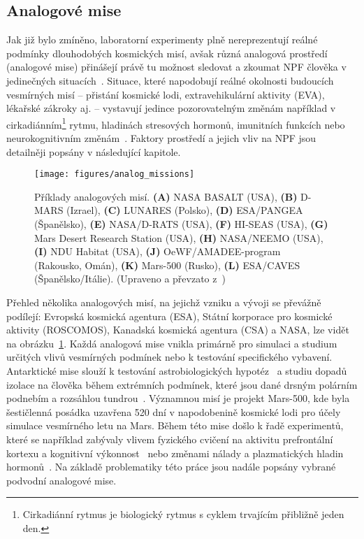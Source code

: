 \subsection{Analogové mise}
\label{subsection:analogove_mise}
Jak již bylo zmíněno, laboratorní experimenty plně nereprezentují reálné
podmínky dlouhodobých kosmických misí, avšak různá analogová prostředí
(analogové mise) přinášejí právě tu možnost sledovat a zkoumat NPF člověka v
jedinečných situacích~\cite{Mogilever2018}. Situace, které napodobují reálné
okolnosti budoucích vesmírných misí -- přistání kosmické lodi, extravehikulární
aktivity (\gls{EVA}), lékařské zákroky aj. -- vystavují jedince pozorovatelným
změnám například v cirkadiánním\footnote{Cirkadiánní rytmus je biologický rytmus
s cyklem trvajícím přibližně jeden den.} rytmu, hladinách stresových hormonů,
imunitních funkcích nebo neurokognitivním změnám~\cite{Pagel2016,Taylor2016}.
Faktory prostředí a jejich vliv na \gls{NPF} jsou detailněji popsány v
následující kapitole.

\begin{figure}[!htb]
    \begin{center}
        \texttt{[image: figures/analog\_missions]}
        \caption{Příklady analogových misí. \textbf{(A)} NASA BASALT (USA),
            \textbf{(B)} D-MARS (Izrael), \textbf{(C)} LUNARES (Polsko),
            \textbf{(D)} ESA/PANGEA (Španělsko), \textbf{(E)} NASA/D-RATS (USA),
            \textbf{(F)} HI-SEAS (USA), \textbf{(G)} Mars Desert Research Station
            (USA), \textbf{(H)} NASA/NEEMO (USA), \textbf{(I)} NDU Habitat (USA),
            \textbf{(J)} OeWF/AMADEE-program (Rakousko, Omán), \textbf{(K)} Mars-500
            (Rusko), \textbf{(L)} ESA/CAVES (Španělsko/Itálie). (Upraveno a převzato
            z~\cite{groemer2020})}
        \label{fig:analog_missions}
    \end{center}
\end{figure}

Přehled několika analogových misí, na jejichž vzniku a vývoji se převážně
podílejí: Evropská kosmická agentura (\gls{ESA}), Státní korporace pro kosmické
aktivity (ROSCOMOS), Kanadská kosmická agentura (\gls{CSA}) a \gls{NASA}, lze
vidět na obrázku~\ref{fig:analog_missions}. Každá analogová mise vnikla primárně
pro simulaci a studium určitých vlivů vesmírných podmínek nebo k testování
specifického vybavení. Antarktické mise slouží k testování astrobiologických
hypotéz~\cite{Mogilever2018} a studiu dopadů izolace na člověka během extrémních
podmínek, které jsou dané drsným polárním podnebím a rozsáhlou
tundrou~\cite{Barkaszi2016,lugg1999}. Významnou misí je projekt Mars-500, kde
byla šestičlenná posádka uzavřena 520 dní v napodobenině kosmické lodi pro účely
simulace vesmírného letu na Mars. Během této mise došlo k řadě experimentů,
které se například zabývaly vlivem fyzického cvičení na aktivitu prefrontální
kortexu a kognitivní výkonnost~\cite{schneider2013} nebo změnami nálady a
plazmatických hladin hormonů~\cite{wang2014}. Na základě problematiky této práce
jsou nadále popsány vybrané podvodní analogové mise.

